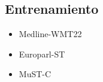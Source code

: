 \documentclass[landscape,spanish]{article}
\begin{document}
\subsection*{Entrenamiento}
\vspace*{10mm}

\begin{minipage}{0.27\linewidth}
\begin{itemize}
    \item Medline-WMT22
    \item Europarl-ST
    \item MuST-C
\end{itemize}    
\end{minipage}
\begin{minipage}[H]{0.5\linewidth}
    \centering
    \label{tab:train_datasets}
\end{minipage}


    
    



\cp %
\end{document}
